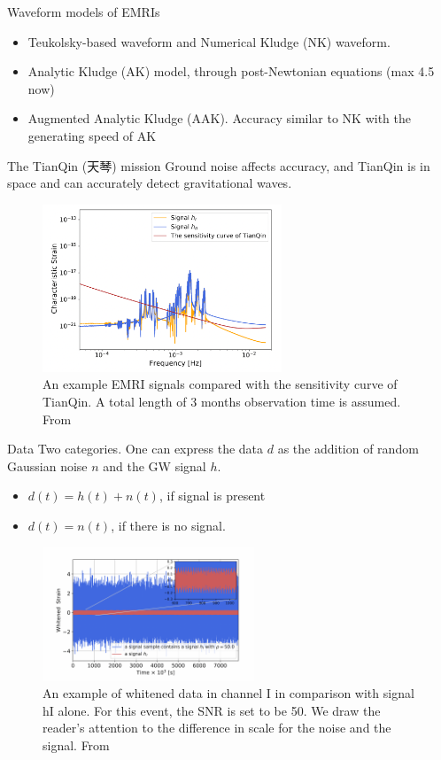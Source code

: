 \documentclass[aspectratio=1610,xcolor={dvipsnames},hyperref={colorlinks,unicode,linkcolor=violet,anchorcolor=blueviolet,citecolor=YellowOrange,filecolor=black,urlcolor=Aquamarine}]{beamer}
\begin{document}
\begin{frame}[label={sec:orge48385b}]{Waveform models of EMRIs}
\begin{itemize}
\item Teukolsky-based waveform and Numerical Kludge (NK) waveform.
\item Analytic Kludge (AK) model, through post-Newtonian equations (max
4.5 now)
\item Augmented Analytic Kludge (AAK). Accuracy similar to NK with the
generating speed of AK
\end{itemize}
\end{frame}

\begin{frame}[label={sec:org845a116}]{The TianQin (天琴) mission}
Ground noise affects accuracy, and TianQin is in space and can
accurately detect gravitational waves.

\begin{figure}[htbp]
\centering
\includegraphics[height=5cm]{./p2.png}
\caption{An example EMRI signals compared with the sensitivity curve of TianQin. A total length of 3 months observation time is assumed. From \cite{zhangDetectingGravitationalWaves2022}}
\end{figure}
\end{frame}

\begin{frame}[label={sec:orgce4cef9}]{Data}
Two categories.  One can express the data \(d\) as the addition of
random Gaussian noise \(n\) and the GW signal \(h\).

\begin{itemize}
\item \(d(t) = h(t) + n(t)\), if signal is present
\item \(d(t) = n(t)\), if there is no signal.
\end{itemize}

\begin{figure}[htbp]
\centering
\includegraphics[height=4cm]{./p3.png}
\caption{An example of whitened data in channel I in comparison with signal hI alone. For this event, the SNR is set to be 50. We draw the reader’s attention to the difference in scale for the noise and the signal. From \cite{zhangDetectingGravitationalWaves2022}}
\end{figure}
\end{frame}
\end{document}

